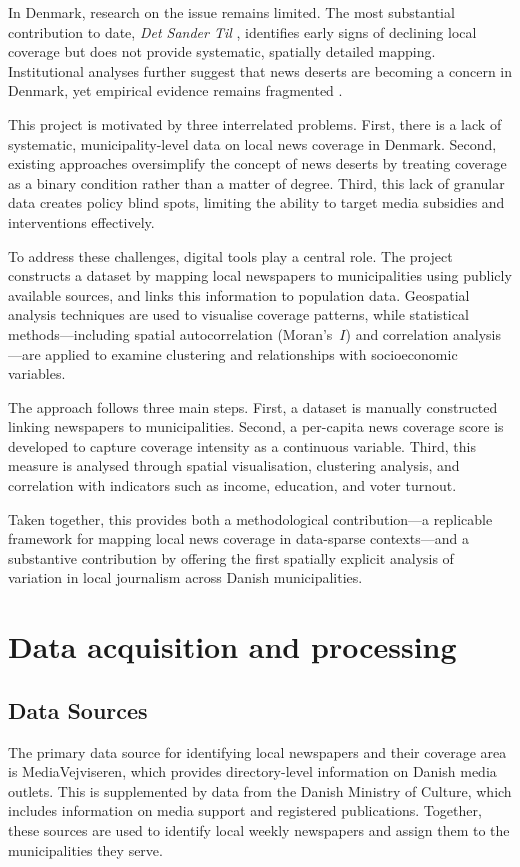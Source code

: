 \documentclass[12pt, a4paper]{article}
\begin{document}
In Denmark, research on the issue remains limited. The most substantial contribution to date, \emph{Det Sander Til} \parencite{oesterby2021}, identifies early signs of declining local coverage but does not provide systematic, spatially detailed mapping. Institutional analyses further suggest that news deserts are becoming a concern in Denmark, yet empirical evidence remains fragmented \parencite{cmpf2024denmark}.

This project is motivated by three interrelated problems. First, there is a lack of systematic, municipality-level data on local news coverage in Denmark. Second, existing approaches oversimplify the concept of news deserts by treating coverage as a binary condition rather than a matter of degree. Third, this lack of granular data creates policy blind spots, limiting the ability to target media subsidies and interventions effectively.

To address these challenges, digital tools play a central role. The project constructs a dataset by mapping local newspapers to municipalities using publicly available sources, and links this information to population data. Geospatial analysis techniques are used to visualise coverage patterns, while statistical methods---including spatial autocorrelation (Moran's~$I$) and correlation analysis---are applied to examine clustering and relationships with socioeconomic variables.

The approach follows three main steps. First, a dataset is manually constructed linking newspapers to municipalities. Second, a per-capita news coverage score is developed to capture coverage intensity as a continuous variable. Third, this measure is analysed through spatial visualisation, clustering analysis, and correlation with indicators such as income, education, and voter turnout.

Taken together, this provides both a methodological contribution---a replicable framework for mapping local news coverage in data-sparse contexts---and a substantive contribution by offering the first spatially explicit analysis of variation in local journalism across Danish municipalities.

\section{Data acquisition and processing}
\subsection{Data Sources}
The primary data source for identifying local newspapers and their coverage area is MediaVejviseren, which provides directory-level information on Danish media outlets. This is supplemented by data from the Danish Ministry of Culture, which includes information on media support and registered publications. Together, these sources are used to identify local weekly newspapers and assign them to the municipalities they serve.
\end{document}
